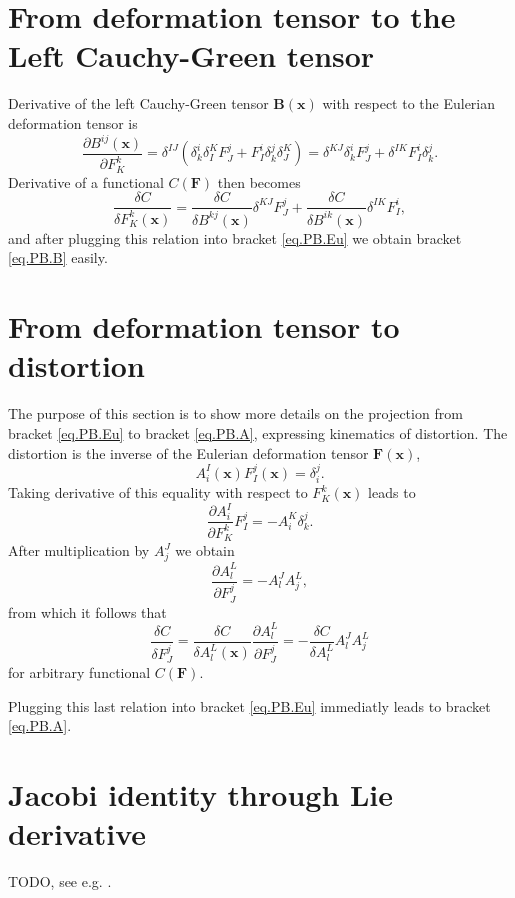 \documentclass[
10pt, %
a4paper, %
oneside, %
headinclude,footinclude, %
BCOR5mm, %
]{scrartcl}
\newcommand{\xx}{\mathbf{x}}
\newcommand{\FF}{\mathbf{F}}
\newcommand{\BB}{\mathbf{B}}
\begin{document}
\section{From deformation tensor to the Left Cauchy-Green tensor}\label{sec.F-B}
Derivative of the left Cauchy-Green tensor $\BB(\xx)$ with respect to the Eulerian deformation tensor is
\begin{equation}
	\frac{\partial B^{ij}(\xx)}{\partial F^k_K} = \delta^{IJ}(\delta^i_k \delta^K_I F^j_J +  F^i_I \delta^j_k \delta^K_J)
	= \delta^{KJ}\delta^i_k F^j_J +  \delta^{IK} F^i_I \delta^j_k.
\end{equation}
Derivative of a functional $C(\FF)$ then becomes
\begin{equation}
	\frac{\delta C}{\delta F^k_K(\xx)} = 
	\frac{\delta C}{\delta B^{kj}(\xx)}\delta^{KJ} F^j_J +  \frac{\delta C}{\delta B^{ik}(\xx)}\delta^{IK} F^i_I,
\end{equation}
and after plugging this relation into bracket \eqref{eq.PB.Eu} we obtain bracket \eqref{eq.PB.B} easily.


\section{From deformation tensor to distortion}\label{sec.F-A}
The purpose of this section is to show more details on the projection from bracket \eqref{eq.PB.Eu} to bracket \eqref{eq.PB.A}, expressing kinematics of distortion. The distortion is the inverse of the Eulerian deformation tensor $\FF(\xx)$, 
\begin{equation}
	A^I_i(\xx) F^j_I(\xx) = \delta^j_i.
\end{equation}
Taking derivative of this equality with respect to $F^k_K(\xx)$ leads to
\begin{equation}
	\frac{\partial A^I_i}{\partial F^k_K} F^j_I = -A^K_i \delta^j_k.
\end{equation}
After multiplication by $A^J_j$ we obtain
\begin{equation}
	\frac{\partial A^L_l}{\partial F^j_J} = -A^J_l A^L_j,
\end{equation}
from which it follows that 
\begin{equation}
	\frac{\delta C}{\delta F^j_J} = \frac{\delta C}{\delta A^L_l(\xx)} \frac{\partial A^L_l}{\partial F^j_J} = -\frac{\delta C}{\delta A^L_l} A^J_l A^L_j
\end{equation}
for arbitrary functional $C(\FF)$.

Plugging this last relation into bracket \eqref{eq.PB.Eu} immediatly leads to bracket \eqref{eq.PB.A}.

\section{Jacobi identity through Lie derivative}\label{sec.Jacobi.L}
TODO, see e.g. \cite{Fecko}.
\end{document}
